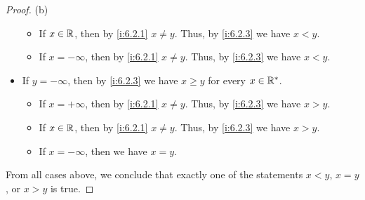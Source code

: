 \begin{proof}{(b)}
\begin{itemize}
\begin{itemize}
            \item If \(x \in \mathbb{R}\), then by \cref{i:6.2.1} \(x \neq y\).
                  Thus, by \cref{i:6.2.3} we have \(x < y\).
            \item If \(x = -\infty\), then by \cref{i:6.2.1} \(x \neq y\).
                  Thus, by \cref{i:6.2.3} we have \(x < y\).
          \end{itemize}
    \item If \(y = -\infty\), then by \cref{i:6.2.3} we have \(x \geq y\) for every \(x \in \mathbb{R}^*\).
          \begin{itemize}
            \item If \(x = +\infty\), then by \cref{i:6.2.1} \(x \neq y\).
                  Thus, by \cref{i:6.2.3} we have \(x > y\).
            \item If \(x \in \mathbb{R}\), then by \cref{i:6.2.1} \(x \neq y\).
                  Thus, by \cref{i:6.2.3} we have \(x > y\).
            \item If \(x = -\infty\), then we have \(x = y\).
          \end{itemize}
  \end{itemize}
  From all cases above, we conclude that exactly one of the statements \(x < y\), \(x = y\), or \(x > y\) is true.
\end{proof}

